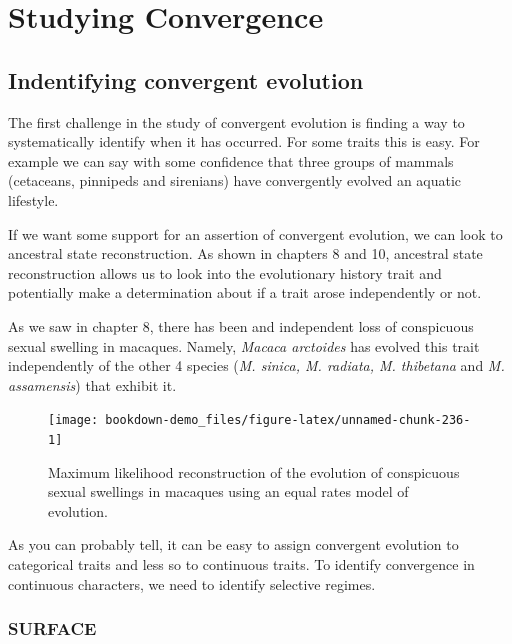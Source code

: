 \documentclass[
]{book}
\begin{document}
\hypertarget{convergence}{%
\chapter{Studying Convergence}\label{convergence}}

\hypertarget{indentifying-convergent-evolution}{%
\section{Indentifying convergent evolution}\label{indentifying-convergent-evolution}}

The first challenge in the study of convergent evolution is finding a way to systematically identify when it has occurred. For some traits this is easy. For example we can say with some confidence that three groups of mammals (cetaceans, pinnipeds and sirenians) have convergently evolved an aquatic lifestyle.

If we want some support for an assertion of convergent evolution, we can look to ancestral state reconstruction. As shown in chapters 8 and 10, ancestral state reconstruction allows us to look into the evolutionary history trait and potentially make a determination about if a trait arose independently or not.

As we saw in chapter 8, there has been and independent loss of conspicuous sexual swelling in macaques. Namely, \emph{Macaca arctoides} has evolved this trait independently of the other 4 species (\emph{M. sinica, M. radiata, M. thibetana} and \emph{M. assamensis}) that exhibit it.

\begin{figure}[H]

{\centering \texttt{[image: bookdown-demo\_files/figure-latex/unnamed-chunk-236-1]} 

}

\caption{Maximum likelihood reconstruction of the evolution of conspicuous sexual swellings in macaques using an equal rates model of evolution.}\label{fig:unnamed-chunk-236}
\end{figure}

As you can probably tell, it can be easy to assign convergent evolution to categorical traits and less so to continuous traits. To identify convergence in continuous characters, we need to identify selective regimes.

\hypertarget{surface}{%
\subsection{SURFACE}\label{surface}}
\end{document}
